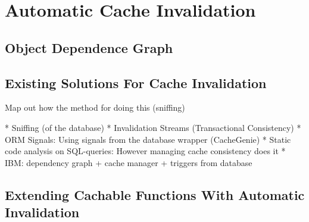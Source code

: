 \chapter{Automatic Cache Invalidation}
\label{chapter:invalidation}



\section{Object Dependence Graph}
\label{sec:object-dependence-graph}








\section{Existing Solutions For Cache Invalidation}
\label{sec:existing_solutions_for_cache_invalidation}

Map out how the method for doing this (sniffing)

* Sniffing (of the database)
* Invalidation Streams (Transactional Consistency)
* ORM Signals: Using signals from the database wrapper (CacheGenie)
* Static code analysis on SQL-queries: However managing cache consistency does it
* IBM: dependency graph + cache manager + triggers from database




\section{Extending Cachable Functions With Automatic Invalidation}
\label{sec:extending_cachable_functions_with_automatic_invalidation}

